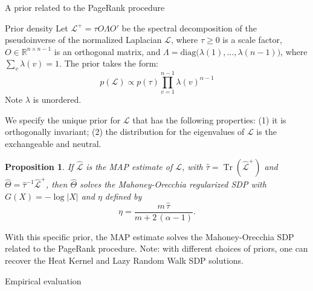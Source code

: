 \documentclass[xcolor=dvipsnames]{beamer}
\DeclareMathOperator{\Tr}{Tr}
\newtheorem{proposition}[theorem]{Proposition}
\begin{document}
\begin{frame}[c]
  \begin{block}{}
  \begin{center}
    \huge{A prior related to the PageRank procedure}
  \end{center}
  \end{block}
\end{frame}


\begin{frame}
  \begin{block}{Prior density}
    Let $\mathcal{L}^{+} = \tau O \Lambda O'$ be the spectral decomposition of
    the pseudoinverse of the normalized Laplacian $\mathcal{L}$, where
    $\tau \geq 0$ is a scale factor, $O \in \mathbb{R}^{n \times n - 1}$ is
    an orthogonal matrix, and
    $\Lambda = \mathrm{diag}\big(\lambda(1), \dotsc, \lambda(n-1)\big)$,
    where $\sum_v \lambda(v) = 1$.  The prior takes the form:
    \[
      p(\mathcal{L}) \propto p(\tau) \prod_{v=1}^{n-1} \lambda(v)^{\alpha - 1}
    \]
    Note $\lambda$ is unordered.
  \end{block}

  We specify the unique prior for $\mathcal{L}$ that has the following properties:
  (1) it is orthogonally invariant; (2) the distribution for the eigenvalues
  of $\mathcal{L}$ is the exchangeable and neutral.
\end{frame}


\begin{frame}
  \begin{proposition}\label{P:map-sdp}
    If $\mathcal{\hat L}$ is the MAP estimate of $\mathcal{L}$, with
    $\hat \tau = \Tr(\mathcal{\hat L}^+)$ and
    $\hat \Theta = \hat \tau^{-1} \mathcal{\hat L}^+$,
    then $\hat \Theta$ solves
    the Mahoney-Orecchia regularized SDP with $G(X) = -\log |X|$ and
    $\eta$ defined by
    \[
      \eta = \frac{m \, \hat \tau}{m + 2\,(\alpha - 1)}.
    \]
  \end{proposition}
 
  With this specific prior, the MAP estimate solves the Mahoney-Orecchia SDP
  related to the PageRank procedure.  Note: with different choices of priors,
  one can recover the Heat Kernel and Lazy Random Walk SDP solutions.
\end{frame}

\begin{frame}[c]
  \begin{block}{}
  \begin{center}
    \huge{Empirical evaluation}
  \end{center}
  \end{block}
\end{frame}
\end{document}
